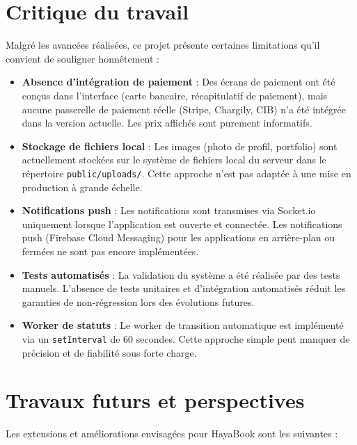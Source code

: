 \section{Critique du travail}

Malgré les avancées réalisées, ce projet présente certaines limitations qu'il convient de souligner honnêtement :

\begin{itemize}
    \item \textbf{Absence d'intégration de paiement} : Des écrans de paiement ont été conçus dans l'interface (carte bancaire, récapitulatif de paiement), mais aucune passerelle de paiement réelle (Stripe, Chargily, CIB) n'a été intégrée dans la version actuelle. Les prix affichés sont purement informatifs.
    \item \textbf{Stockage de fichiers local} : Les images (photo de profil, portfolio) sont actuellement stockées sur le système de fichiers local du serveur dans le répertoire \texttt{public/uploads/}. Cette approche n'est pas adaptée à une mise en production à grande échelle.
    \item \textbf{Notifications push} : Les notifications sont transmises via Socket.io uniquement lorsque l'application est ouverte et connectée. Les notifications push (Firebase Cloud Messaging) pour les applications en arrière-plan ou fermées ne sont pas encore implémentées.
    \item \textbf{Tests automatisés} : La validation du système a été réalisée par des tests manuels. L'absence de tests unitaires et d'intégration automatisés réduit les garanties de non-régression lors des évolutions futures.
    \item \textbf{Worker de statuts} : Le worker de transition automatique est implémenté via un \texttt{setInterval} de 60 secondes. Cette approche simple peut manquer de précision et de fiabilité sous forte charge.
\end{itemize}

\section{Travaux futurs et perspectives}

Les extensions et améliorations envisagées pour HayaBook sont les suivantes :

